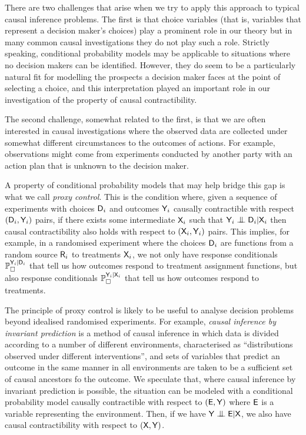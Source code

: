There are two challenges that arise when we try to apply this approach to typical causal inference problems. The first is that choice variables (that is, variables that represent a decision maker's choices) play a prominent role in our theory but in many common causal investigations they do not play such a role. Strictly speaking, conditional probability models may be applicable to situations where no decision makers can be identified. However, they do seem to be a particularly natural fit for modelling the prospects a decision maker faces at the point of selecting a choice, and this interpretation played an important role in our investigation of the property of causal contractibility.

The second challenge, somewhat related to the first, is that we are often interested in causal investigations where the observed data are collected under somewhat different circumstances to the outcomes of actions. For example, observations might come from experiments conducted by another party with an action plan that is unknown to the decision maker.

A property of conditional probability models that may help bridge this gap is what we call \emph{proxy control}. This is the condition where, given a sequence of experiments with choices $\mathsf{D}_i$ and outcomes $\mathsf{Y}_i$ causally contractible with respect $(\mathsf{D}_i,\mathsf{Y}_i)$ pairs, if there exists some intermediate $\mathsf{X}_i$ such that $\RV{Y}_i\CI\RV{D}_i|\RV{X}_i$ then causal contractibility also holds with respect to $(\mathsf{X}_i,\mathsf{Y}_i)$ pairs. This implies, for example, in a randomised experiment where the choices $\mathsf{D}_i$ are functions from a random source $\mathsf{R}_i$ to treatments $\mathsf{X}_i$, we not only have response conditionals $\mathbb{P}_\square^{\mathsf{Y}_i|\mathsf{D}_i}$ that tell us how outcomes respond to treatment assignment functions, but also response conditionals $\mathbb{P}_\square^{\mathsf{Y}_i|\mathsf{X}_i}$ that tell us how outcomes respond to treatments.

The principle of proxy control is likely to be useful to analyse decision problems beyond idealised randomised experiments. For example, \emph{causal inference by invariant prediction} \citep{peters_causal_2016} is a method of causal inference in which data is divided according to a number of different environments, characterised as ``distributions observed under different interventions'', and sets of variables that predict an outcome in the same manner in all environments are taken to be a sufficient set of causal ancestors fo the outcome. We speculate that, where causal inference by invariant prediction is possible, the situation can be modeled with a conditional probability model causally contractible with respect to $(\mathsf{E},\mathsf{Y})$ where $\mathsf{E}$ is a variable representing the environment. Then, if we have $\RV{Y}\CI\RV{E}|\RV{X}$, we also have causal contractibility with respect to $(\mathsf{X},\mathsf{Y})$.

